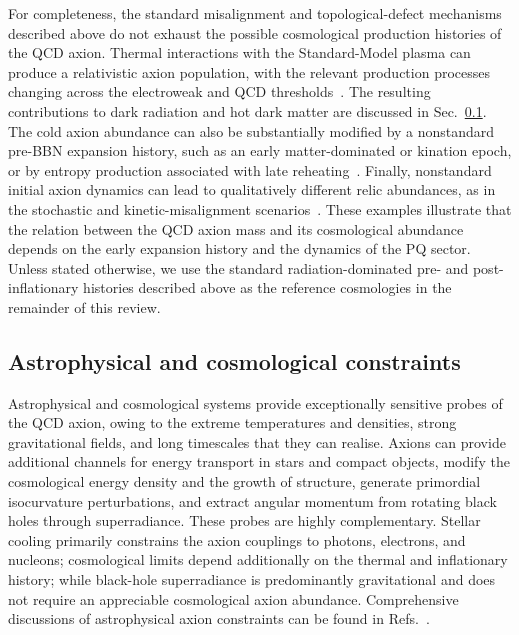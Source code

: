 \documentclass[review]{elsarticle}
\numberwithin{equation}{section}
\numberwithin{table}{section}
\numberwithin{figure}{section}
\begin{document}
For completeness, the standard misalignment and topological-defect mechanisms described above do not exhaust the possible cosmological production histories of the QCD axion. Thermal interactions with the Standard-Model plasma can produce a relativistic axion population, with the relevant production processes changing across the electroweak and QCD thresholds~\cite{Arias-Aragon:2020shv,DEramo:2021psx,DEramo:2021lgb}. The resulting contributions to dark radiation and hot dark matter are discussed in Sec.~\ref{sec:axion-astro-cosmo-constraints}. The cold axion abundance can also be substantially modified by a nonstandard pre-BBN expansion history, such as an early matter-dominated or kination epoch, or by entropy production associated with late reheating~\cite{Arias:2021rer,Bernal:2021yyb}. Finally, nonstandard initial axion dynamics can lead to qualitatively different relic abundances, as in the stochastic and kinetic-misalignment scenarios~\cite{Graham:2018jyp,Co:2019jts}. These examples illustrate that the relation between the QCD axion mass and its cosmological abundance depends on the early expansion history and the dynamics of the PQ sector. Unless stated otherwise, we use the standard radiation-dominated pre- and post-inflationary histories described above as the reference cosmologies in the remainder of this review.



\subsection{Astrophysical and cosmological constraints}
\label{sec:axion-astro-cosmo-constraints}

Astrophysical and cosmological systems provide exceptionally sensitive probes of the QCD axion, owing to the extreme temperatures and densities, strong gravitational fields, and long timescales that they can realise. Axions can provide additional channels for energy transport in stars and compact objects, modify the cosmological energy density and the growth of structure, generate primordial isocurvature perturbations, and extract angular momentum from rotating black holes through superradiance. These probes are highly complementary. Stellar cooling primarily constrains the axion couplings to photons, electrons, and nucleons; cosmological limits depend additionally on the thermal and inflationary history; while black-hole superradiance is predominantly gravitational and does not require an appreciable cosmological axion abundance. Comprehensive discussions of astrophysical axion constraints can be found in Refs.~\cite{Raffelt:2006cw,DiLuzio:2020wdo,Caputo:2024oqc,Cicoli:2026fqp}.
\end{document}

